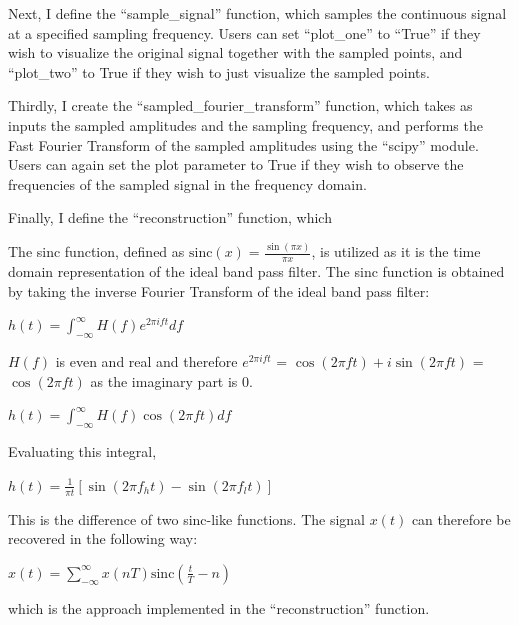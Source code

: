 \documentclass{article}
\begin{document}
Next, I define the ``sample\_signal'' function, which samples the continuous signal at a specified sampling frequency.
Users can set ``plot\_one'' to ``True'' if they wish to visualize the original signal together with the sampled points, and ``plot\_two'' to True if they wish to just visualize the sampled points.

Thirdly, I create the ``sampled\_fourier\_transform'' function, which takes as inputs the sampled amplitudes and the sampling frequency, and performs the Fast Fourier Transform of the sampled amplitudes using the ``scipy'' module. %
Users can again set the plot parameter to True if they wish to observe the frequencies of the sampled signal in the frequency domain. %

Finally, I define the ``reconstruction'' function, which 

The sinc function, defined as $\text{sinc}(x) = \frac{\sin(\pi x)}{\pi x}$, is utilized as it is the time domain representation of the ideal band pass filter.
The sinc function is obtained by taking the inverse Fourier Transform of the ideal band pass filter:
\begin{center}
    \begin{math}
        h(t) = \int_{-\infty}^{\infty} H(f) e^{2\pi i ft} df
    \end{math}  
\end{center}
$H(f)$ is even and real and therefore $e^{2\pi i ft}$ = $\cos(2\pi ft) + i \sin(2\pi ft)$ = $\cos(2\pi ft)$ as the imaginary part is 0.  
\begin{center}
    \begin{math}
        h(t) = \int_{-\infty}^{\infty} H(f) \cos(2\pi ft) df
    \end{math}  
\end{center}
Evaluating this integral,
\begin{center}
    \begin{math}
        h(t) = \frac{1}{\pi t} \left[ \sin(2\pi f_h t) - \sin(2\pi f_l t) \right]
    \end{math}  
\end{center}
This is the difference of two sinc-like functions. 
The signal $x(t)$ can therefore be recovered in the following way:
\begin{center}
    \begin{math}
        x(t) = \sum_{-\infty}^{\infty} x(nT) \text{sinc}\left( \frac{t}{T} - n \right)
    \end{math}  
\end{center}
which is the approach implemented in the ``reconstruction'' function. 
\end{document}
